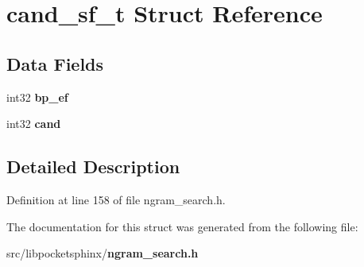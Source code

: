 \section{cand\-\_\-sf\-\_\-t Struct Reference}
\label{structcand__sf__t}
\subsection*{Data Fields}
\begin{DoxyCompactItemize}
\item 
int32 {\bfseries bp\-\_\-ef}\label{structcand__sf__t_ab04890bd8e455c234bf78aec9dab8803}

\item 
int32 {\bfseries cand}\label{structcand__sf__t_a7fcc5ff33fe4ad1a57d1acc272a29f36}

\end{DoxyCompactItemize}


\subsection{Detailed Description}


Definition at line 158 of file ngram\-\_\-search.\-h.



The documentation for this struct was generated from the following file\-:\begin{DoxyCompactItemize}
\item 
src/libpocketsphinx/{\bf ngram\-\_\-search.\-h}\end{DoxyCompactItemize}
